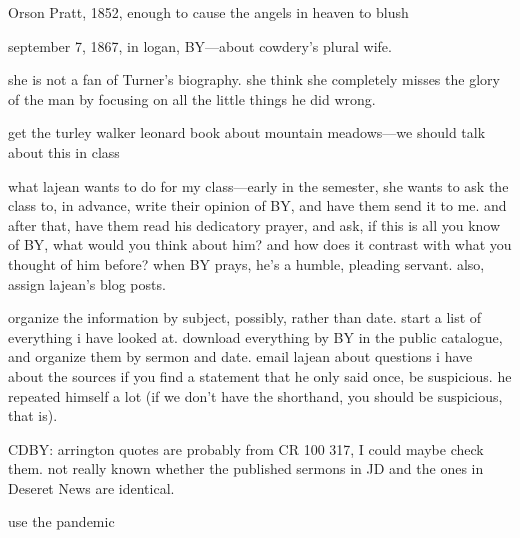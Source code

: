 Orson Pratt, 1852, enough to cause the angels in heaven to blush

september 7, 1867, in logan, BY---about cowdery's plural wife.

she is not a fan of Turner's biography. she think she completely misses the glory of the man by focusing on all the little things he did wrong.

get the turley walker leonard book about mountain meadows---we should talk about this in class

what lajean wants to do for my class---early in the semester, she wants to ask the class to, in advance, write their opinion of BY, and have them send it to me. and after that, have them read his dedicatory prayer, and ask, if this is all you know of BY, what would you think about him? and how does it contrast with what you thought of him before? when BY prays, he's a humble, pleading servant.
	also, assign lajean's blog posts.
	
organize the information by subject, possibly, rather than date.
	start a list of everything i have looked at.
	download everything by BY in the public catalogue, and organize them by sermon and date.
	email lajean about questions i have about the sources
	if you find a statement that he only said once, be suspicious. he repeated himself a lot (if we don't have the shorthand, you should be suspicious, that is).
	
CDBY: arrington quotes are probably from CR 100 317, I could maybe check them. 
	not really known whether the published sermons in JD and the ones in Deseret News are identical.
	
use the pandemic 